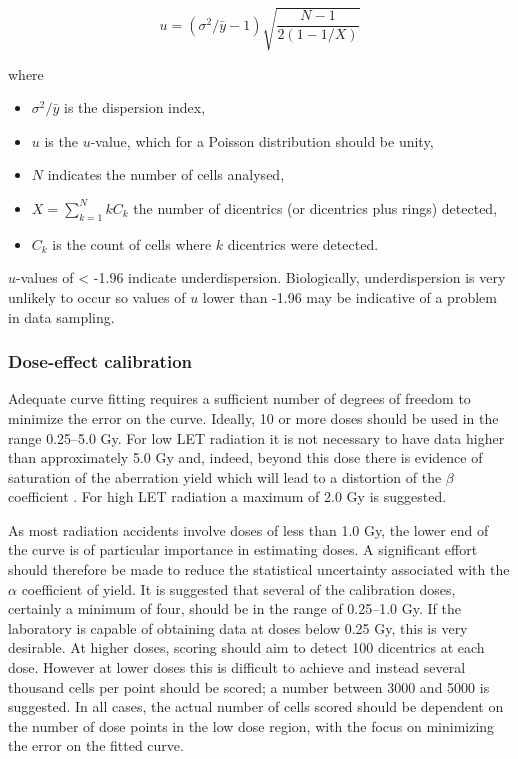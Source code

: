 \documentclass[]{scrartcl}
\providecommand{\tightlist}{%
  \setlength{\itemsep}{0pt}\setlength{\parskip}{0pt}}
\begin{document}
\begin{equation} 
  u = (\sigma^{2}/\bar{y} - 1) \sqrt{\frac{N - 1}{2 (1 - 1/X)}}
  \label{eq:u-value}
\end{equation}

where

\begin{itemize}
\tightlist
\item
  \(\sigma^{2}/\bar{y}\) is the dispersion index,
\item
  \(u\) is the \(u\)-value, which for a Poisson distribution should be unity,
\item
  \(N\) indicates the number of cells analysed,
\item
  \(X = \sum_{k=1}^{N} k C_{k}\) the number of dicentrics (or dicentrics plus rings) detected,
\item
  \(C_{k}\) is the count of cells where \(k\) dicentrics were detected.
\end{itemize}

\(u\)-values of \textless{} -1.96 indicate underdispersion. Biologically, underdispersion is very unlikely to occur so values of \(u\) lower than -1.96 may be indicative of a problem in data sampling.

\hypertarget{dose-effect-calibration}{%
\subsubsection{Dose-effect calibration}\label{dose-effect-calibration}}

Adequate curve fitting requires a sufficient number of degrees of freedom to minimize the error on the curve. Ideally, 10 or more doses should be used in the range 0.25--5.0 Gy. For low LET radiation it is not necessary to have data higher than approximately 5.0 Gy and, indeed, beyond this dose there is evidence of saturation of the aberration yield which will lead to a distortion of the \(\beta\) coefficient \citep{Lloyd1983}. For high LET radiation a maximum of 2.0 Gy is suggested.

As most radiation accidents involve doses of less than 1.0 Gy, the lower end of the curve is of particular importance in estimating doses. A significant effort should therefore be made to reduce the statistical uncertainty associated with the \(\alpha\) coefficient of yield. It is suggested that several of the calibration doses, certainly a minimum of four, should be in the range of 0.25--1.0 Gy. If the laboratory is capable of obtaining data at doses below 0.25 Gy, this is very desirable. At higher doses, scoring should aim to detect 100 dicentrics at each dose. However at lower doses this is difficult to achieve and instead several thousand cells per point should be scored; a number between 3000 and 5000 is suggested. In all cases, the actual number of cells scored should be dependent on the number of dose points in the low dose region, with the focus on minimizing the error on the fitted curve.
\end{document}
